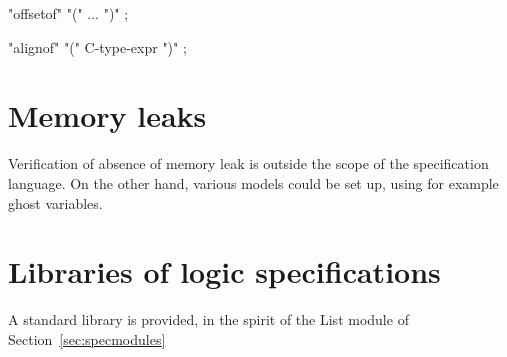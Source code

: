  "offsetof" "(" ... ")" ; \experimental

 "alignof" "(" C-type-expr ")" ; \experimental

\section{Memory leaks}

\experimental

Verification of absence of memory leak is outside the scope of the
specification language. On the other hand, various models could be set
up, using for example ghost variables.

\section{Libraries of logic specifications}
\label{sec:speclibraries}

A standard library is provided, in the spirit of the List module of
Section~\ref{sec:specmodules}

